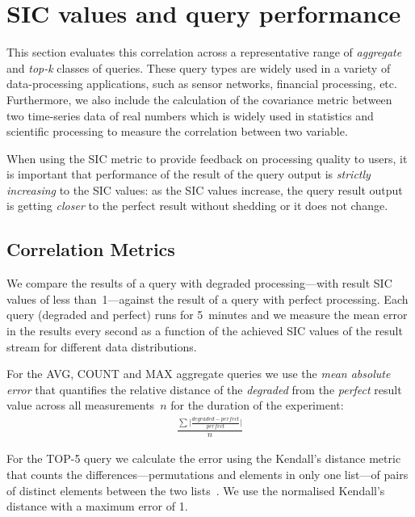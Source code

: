 \section{SIC values and query performance}

This section evaluates this correlation across a representative range of \emph{aggregate} and
\emph{top-k} classes of queries. These query types are widely used in a variety of data-processing
applications, such as sensor networks, financial processing, etc. Furthermore, we also include the
calculation of the covariance metric between two time-series data of real numbers which is widely used in
statistics and scientific processing to measure the correlation between two variable.

When using the SIC metric to provide feedback on processing quality to users,
it is important that performance of the result of the query output is 
\emph{strictly increasing} to the SIC values: \ie as the SIC values increase,
the query result output is getting \emph{closer} to the perfect result 
without shedding or it does not change. 

\gap
\vskip 5cm

\subsection{Correlation Metrics}

We compare the results of a query with degraded processing---\ie with result
SIC values of less than~1---against the result of a query with perfect
processing. Each query (degraded and perfect) runs for 5~minutes and we measure
the mean error in the results every second as a function of the achieved 
SIC values of the result stream for different data distributions.

For the \textnormal{AVG}, \textnormal{COUNT} and \textnormal{MAX} aggregate 
queries we use the \emph{mean absolute error} that quantifies the relative distance of the
\emph{degraded} from the \emph{perfect} result value across all
measurements~$n$ for the duration of the experiment:
\begin{align}
\frac{ \sum \lvert {\displaystyle \frac{\displaystyle \mathit{degraded} - \displaystyle \mathit{perfect}}{\displaystyle \mathit{perfect}}}  \rvert}{\displaystyle n}
\end{align}

For the \textnormal{TOP-5} query we calculate the error using the
Kendall's distance metric that counts the differences---\ie permutations and
elements in only one list---of pairs of distinct elements between the two
lists~\cite{kendall}. We use the normalised Kendall's distance with a maximum error of 1.

